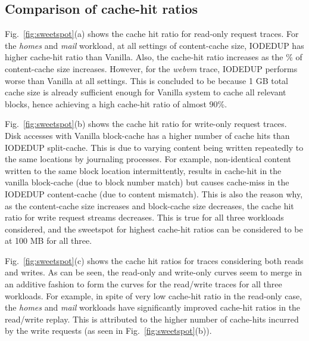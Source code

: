 \subsection{Comparison of cache-hit ratios}

Fig.~\ref{fig:sweetspot}(a) shows the cache hit ratio for read-only
request traces.
For the \textit{homes} and \textit{mail} workload,
at all settings of content-cache size,
IODEDUP has higher cache-hit ratio than Vanilla. Also, the cache-hit
ratio increases as the \% of content-cache size increases.
However, for the \textit{webvm} trace,
IODEDUP performs worse than Vanilla at all settings. This
is concluded to be because
1 GB total cache size is
already sufficient enough for Vanilla system to cache all relevant
blocks, hence achieving a high cache-hit ratio of almost 90\%.

Fig.~\ref{fig:sweetspot}(b) shows the cache hit ratio for write-only
request traces. Disk accesses with Vanilla block-cache has
a higher number of cache hits than IODEDUP split-cache. 
This is due to varying content being written repeatedly to the same
locations by journaling processes.
For example, non-identical content written to the same block location
intermittently,
results in cache-hit in the vanilla block-cache (due to block number match)
but causes cache-miss in the IODEDUP content-cache (due to content mismatch).
This is also the reason why,
as the content-cache size increases and block-cache size decreases, the
cache hit ratio for write request streams decreases. This is true for
all three workloads considered, and the sweetspot for highest cache-hit
ratios can be considered to be at 100 MB for all three.



Fig.~\ref{fig:sweetspot}(c) shows the cache hit ratios
for traces considering both reads and writes. As can be seen,
the read-only and write-only curves seem to merge in an additive fashion
to form the curves for the read/write traces for all three workloads.
For example, in spite of very low cache-hit ratio in the read-only case,
the \textit{homes} and \textit{mail} workloads have significantly improved
cache-hit ratios in the read/write replay. This is attributed to the
higher number of cache-hits incurred by the write requests (as seen in
Fig.~\ref{fig:sweetspot}(b)).

